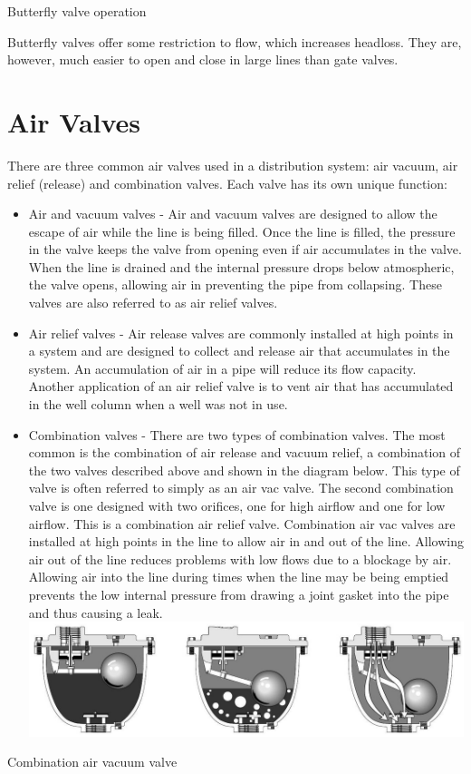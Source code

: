 \documentclass[10pt]{article}
\begin{document}
Butterfly valve operation

Butterfly valves offer some restriction to flow, which increases headloss. They are, however, much easier to open and close in large lines than gate valves.

\section{Air Valves}
There are three common air valves used in a distribution system: air vacuum, air relief (release) and combination valves. Each valve has its own unique function:

\begin{itemize}
  \item Air and vacuum valves - Air and vacuum valves are designed to allow the escape of air while the line is being filled. Once the line is filled, the pressure in the valve keeps the valve from opening even if air accumulates in the valve. When the line is drained and the internal pressure drops below atmospheric, the valve opens, allowing air in preventing the pipe from collapsing. These valves are also referred to as air relief valves.

  \item Air relief valves - Air release valves are commonly installed at high points in a system and are designed to collect and release air that accumulates in the system. An accumulation of air in a pipe will reduce its flow capacity. Another application of an air relief valve is to vent air that has accumulated in the well column when a well was not in use.

  \item Combination valves - There are two types of combination valves. The most common is the combination of air release and vacuum relief, a combination of the two valves described above and shown in the diagram below. This type of valve is often referred to simply as an air vac valve. The second combination valve is one designed with two orifices, one for high airflow and one for low airflow. This is a combination air relief valve. Combination air vac valves are installed at high points in the line to allow air in and out of the line. Allowing air out of the line reduces problems with low flows due to a blockage by air. Allowing air into the line during times when the line may be being emptied prevents the low internal pressure from drawing a joint gasket into the pipe and thus causing a leak.\\

\includegraphics[max width=\textwidth]{AirVacuumValve}

\end{itemize}
Combination air vacuum valve
\end{document}
